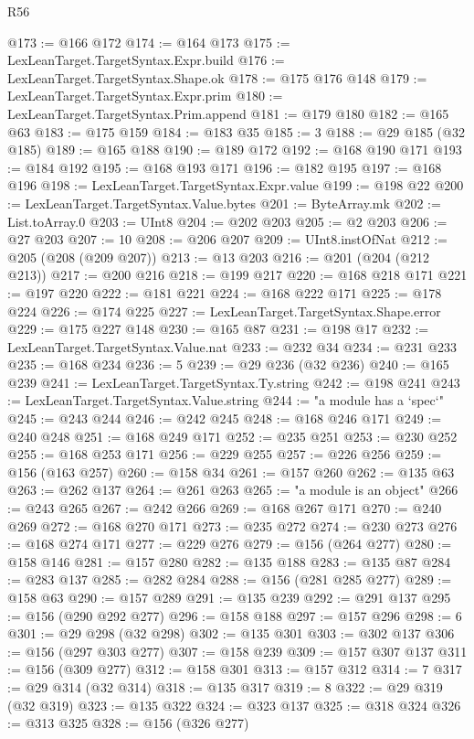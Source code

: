 \begin{lexlean}{R56}
\begin{coremodule}
@173 := @166 @172
@174 := @164 @173
@175 := LexLeanTarget.TargetSyntax.Expr.build
@176 := LexLeanTarget.TargetSyntax.Shape.ok
@178 := @175 @176 @148
@179 := LexLeanTarget.TargetSyntax.Expr.prim
@180 := LexLeanTarget.TargetSyntax.Prim.append
@181 := @179 @180
@182 := @165 @63
@183 := @175 @159
@184 := @183 @35
@185 := 3
@188 := @29 @185 (@32 @185)
@189 := @165 @188
@190 := @189 @172
@192 := @168 @190 @171
@193 := @184 @192
@195 := @168 @193 @171
@196 := @182 @195
@197 := @168 @196
@198 := LexLeanTarget.TargetSyntax.Expr.value
@199 := @198 @22
@200 := LexLeanTarget.TargetSyntax.Value.bytes
@201 := ByteArray.mk
@202 := List.toArray.{0}
@203 := UInt8
@204 := @202 @203
@205 := @2 @203
@206 := @27 @203
@207 := 10
@208 := @206 @207
@209 := UInt8.instOfNat
@212 := @205 (@208 (@209 @207))
@213 := @13 @203
@216 := @201 (@204 (@212 @213))
@217 := @200 @216
@218 := @199 @217
@220 := @168 @218 @171
@221 := @197 @220
@222 := @181 @221
@224 := @168 @222 @171
@225 := @178 @224
@226 := @174 @225
@227 := LexLeanTarget.TargetSyntax.Shape.error
@229 := @175 @227 @148
@230 := @165 @87
@231 := @198 @17
@232 := LexLeanTarget.TargetSyntax.Value.nat
@233 := @232 @34
@234 := @231 @233
@235 := @168 @234
@236 := 5
@239 := @29 @236 (@32 @236)
@240 := @165 @239
@241 := LexLeanTarget.TargetSyntax.Ty.string
@242 := @198 @241
@243 := LexLeanTarget.TargetSyntax.Value.string
@244 := "a module has a `spec`"
@245 := @243 @244
@246 := @242 @245
@248 := @168 @246 @171
@249 := @240 @248
@251 := @168 @249 @171
@252 := @235 @251
@253 := @230 @252
@255 := @168 @253 @171
@256 := @229 @255
@257 := @226 @256
@259 := @156 (@163 @257)
@260 := @158 @34
@261 := @157 @260
@262 := @135 @63
@263 := @262 @137
@264 := @261 @263
@265 := "a module is an object"
@266 := @243 @265
@267 := @242 @266
@269 := @168 @267 @171
@270 := @240 @269
@272 := @168 @270 @171
@273 := @235 @272
@274 := @230 @273
@276 := @168 @274 @171
@277 := @229 @276
@279 := @156 (@264 @277)
@280 := @158 @146
@281 := @157 @280
@282 := @135 @188
@283 := @135 @87
@284 := @283 @137
@285 := @282 @284
@288 := @156 (@281 @285 @277)
@289 := @158 @63
@290 := @157 @289
@291 := @135 @239
@292 := @291 @137
@295 := @156 (@290 @292 @277)
@296 := @158 @188
@297 := @157 @296
@298 := 6
@301 := @29 @298 (@32 @298)
@302 := @135 @301
@303 := @302 @137
@306 := @156 (@297 @303 @277)
@307 := @158 @239
@309 := @157 @307 @137
@311 := @156 (@309 @277)
@312 := @158 @301
@313 := @157 @312
@314 := 7
@317 := @29 @314 (@32 @314)
@318 := @135 @317
@319 := 8
@322 := @29 @319 (@32 @319)
@323 := @135 @322
@324 := @323 @137
@325 := @318 @324
@326 := @313 @325
@328 := @156 (@326 @277)

\end{coremodule}
\end{lexlean}
